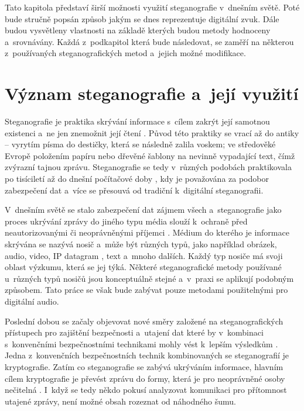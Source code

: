 Tato kapitola představí širší možnosti využití steganografie v~dnešním světě.
Poté bude stručně popsán způsob jakým se dnes reprezentuje digitální zvuk. Dále
budou vysvětleny vlastnosti na základě kterých budou metody hodnoceny
a~srovnávány. Každá z~podkapitol která bude následovat, se zaměří na některou
z~používaných steganografických metod a~jejich možné modifikace.

\section{Význam steganografie a~její využití}
\label{sec:motivation-and-uses}

Steganografie je praktika skrývání informace s~cílem zakrýt její samotnou
existenci a~ne jen znemožnit její čtení
\cite{AlSabhany2020}\cite{Anderson1998}\cite{Djebbar2012}\cite{Dutta2020}.
Původ této praktiky se vrací až do antiky -- vyrytím písma do destičky, která
se následně zalila voskem; ve středověké Evropě položením papíru nebo dřevěné
šablony na nevinně vypadající text, čímž zvýrazní tajnou zprávu. Steganografie
se tedy v~různých podobách praktikovala po tisíciletí až do dnešní počítačové
doby \cite{Anderson1998}, kdy je považována za podobor zabezpečení dat
\cite{Djebbar2012} a~více se přesouvá od tradiční k~digitální steganografii.

V~dnešním světě se stalo zabezpečení dat zájmem všech a~steganografie jako
proces ukrývání zprávy do jiného typu média slouží k~ochraně před
neautorizovanými či neoprávněnými příjemci \cite{Dutta2020}. Médium do kterého
je informace skrývána se nazývá nosič a~může být různých typů, jako například
obrázek, audio, video, IP datagram \cite{Dutta2020}, text a~mnoho dalších.
Každý typ nosiče má svoji oblast výzkumu, která se jej týká. Některé
steganografické metody používané u~různých typů nosičů jsou konceptuálně stejné
a~v~praxi se aplikují podobným způsobem. Tato práce se však bude zabývat pouze
metodami použitelnými pro digitální audio.

Poslední dobou se začaly objevovat nové směry založené na steganografických
přístupech pro zajištění bezpečnosti a~utajení dat které by v~kombinaci
s~konvenčními bezpečnostními technikami mohly vést k~lepším výsledkům
\cite{Djebbar2012}. Jedna z~konvenčních bezpečnostních technik kombinovaných se
steganografií je kryptografie. Zatím co steganografie se zabývá ukrýváním
informace, hlavním cílem kryptografie je převést zprávu do formy, která je pro
neoprávněné osoby nečitelná \cite{AlSabhany2020}. I~když se tedy někdo pokusí
analyzovat komunikaci pro přítomnost utajené zprávy, není možné obsah rozeznat
od náhodného šumu.

